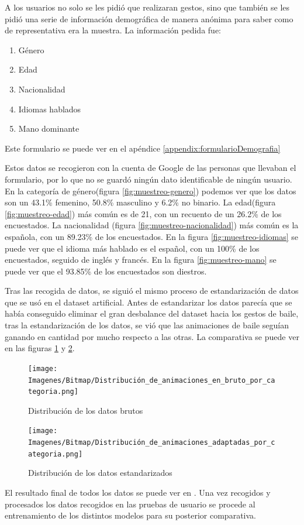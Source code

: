 A los usuarios no solo se les pidió que realizaran gestos, sino que también se les pidió una serie de información demográfica de manera anónima para saber como de representativa era la muestra. La información pedida fue:

\begin{enumerate}
	\item Género
	\item Edad
	\item Nacionalidad
	\item Idiomas hablados
	\item Mano dominante
\end{enumerate}

Este formulario se puede ver en el apéndice \ref{appendix:formularioDemografia}

Estos datos se recogieron con la cuenta de Google de las personas que llevaban el formulario, por lo que no se guardó ningún dato identificable de ningún usuario. En la categoría de género(figura \ref{fig:muestreo-genero}) podemos ver que los datos son un 43.1\% femenino, 50.8\% masculino y 6.2\% no binario. La edad(figura \ref{fig:muestreo-edad}) más común es de 21, con un recuento de un 26.2\% de los encuestados. La nacionalidad (figura \ref{fig:muestreo-nacionalidad}) más común es la española, con un 89.23\% de los encuestados. En la figura \ref{fig:muestreo-idiomas} se puede ver que el idioma más hablado es el español, con un 100\% de los encuestados, seguido de inglés y francés. En la figura \ref{fig:muestreo-mano} se puede ver que el 93.85\% de los encuestados son diestros.

Tras las recogida de datos, se siguió el mismo proceso de estandarización de datos que se usó en el dataset artificial. Antes de estandarizar los datos parecía que se había conseguido eliminar el gran desbalance del dataset hacia los gestos de baile, tras la estandarización de los datos, se vió que las animaciones de baile seguían ganando en cantidad por mucho respecto a las otras. La comparativa se puede ver en las figuras \ref{fig:datos-bruto} y \ref{fig:datos-estandar}.

\begin{figure}[H]
	\centering
	\texttt{[image: Imagenes/Bitmap/Distribución\_de\_animaciones\_en\_bruto\_por\_categoria.png]}
	\caption{Distribución de los datos brutos}
	\label{fig:datos-bruto}
\end{figure}

\begin{figure}[H]
	\centering
	\texttt{[image: Imagenes/Bitmap/Distribución\_de\_animaciones\_adaptadas\_por\_categoria.png]}
	\caption{Distribución de los datos estandarizados}
	\label{fig:datos-estandar}
\end{figure}

El resultado final de todos los datos se puede ver en \cite{csv-pose-animations}. Una vez recogidos y procesados los datos recogidos en las pruebas de usuario se procede al entrenamiento de los distintos modelos para su posterior comparativa.